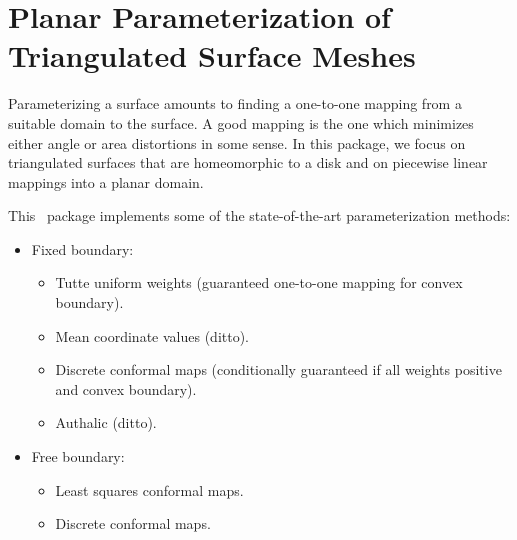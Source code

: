 
\chapter{Planar Parameterization of Triangulated Surface Meshes}
\label{chap:parameterization_ref}


Parameterizing a surface amounts to finding a one-to-one mapping from
a suitable domain to the surface. A good mapping is the one which
minimizes either angle or area distortions in some sense. In this
package, we focus on triangulated surfaces that are homeomorphic to a
disk and on piecewise linear mappings into a planar domain.


This \cgal\ package implements some of
the state-of-the-art parameterization methods:
\begin{itemize}

\item Fixed boundary:

    \begin{itemize}

    \item Tutte uniform weights (guaranteed one-to-one mapping for
    convex boundary).

    \item Mean coordinate values (ditto).

    \item Discrete conformal maps (conditionally guaranteed if all
    weights positive and convex boundary).

    \item Authalic (ditto).

    \end{itemize}

\item Free boundary:

    \begin{itemize}

    \item Least squares conformal maps.

    \item Discrete conformal maps.

    \end{itemize}

\end{itemize}


